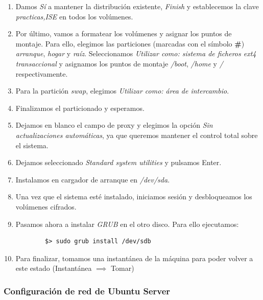 \documentclass[12pt,spanish]{article}
\begin{document}
\begin{enumerate}
	\item Damos \textit{Sí} a mantener la distribución existente, \textit{Finish} y establecemos la clave \textit{practicas,ISE} en todos los volúmenes.
	\item Por último, vamos a formatear los volúmenes y asignar los puntos de montaje. Para ello, elegimos las particiones (marcadas con el símbolo \textbf{\#}) \textit{arranque}, \textit{hogar} y \textit{raíz}. Seleccionamos \textit{Utilizar como: sistema de ficheros ext4 transaccional} y asignamos los puntos de montaje \textit{/boot}, \textit{/home} y \textit{/} respectivamente.
	\item Para la partición \textit{swap}, elegimos \textit{Utilizar como: área de intercambio}.
	\item Finalizamos el particionado y esperamos.
	\item Dejamos en blanco el campo de proxy y elegimos la opción \textit{Sin actualizaciones automáticas}, ya que queremos mantener el control total sobre el sistema.
	\item Dejamos seleccionado \textit{Standard system utilities} y pulsamos Enter.
	\item Instalamos en cargador de arranque en \textit{/dev/sda}.
	\item Una vez que el sistema esté instalado, iniciamos sesión y desbloqueamos los volúmenes cifrados.
	\item Pasamos ahora a instalar \textit{GRUB} en el otro disco. Para ello ejecutamos:
	\begin{lstlisting}
		$> sudo grub install /dev/sdb
	\end{lstlisting}
	\item Para finalizar, tomamos una instantánea de la máquina para poder volver a este estado (Instantánea $\implies$ Tomar)

\end{enumerate}

\subsubsection{Configuración de red de Ubuntu Server}
\end{document}
